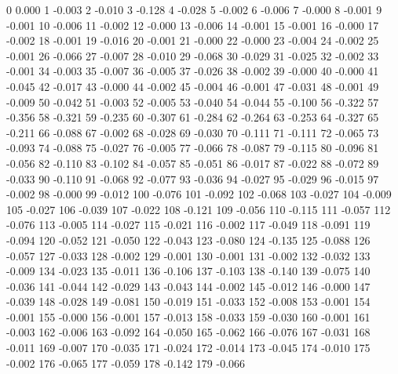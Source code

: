0 0.000
1 -0.003
2 -0.010
3 -0.128
4 -0.028
5 -0.002
6 -0.006
7 -0.000
8 -0.001
9 -0.001
10 -0.006
11 -0.002
12 -0.000
13 -0.006
14 -0.001
15 -0.001
16 -0.000
17 -0.002
18 -0.001
19 -0.016
20 -0.001
21 -0.000
22 -0.000
23 -0.004
24 -0.002
25 -0.001
26 -0.066
27 -0.007
28 -0.010
29 -0.068
30 -0.029
31 -0.025
32 -0.002
33 -0.001
34 -0.003
35 -0.007
36 -0.005
37 -0.026
38 -0.002
39 -0.000
40 -0.000
41 -0.045
42 -0.017
43 -0.000
44 -0.002
45 -0.004
46 -0.001
47 -0.031
48 -0.001
49 -0.009
50 -0.042
51 -0.003
52 -0.005
53 -0.040
54 -0.044
55 -0.100
56 -0.322
57 -0.356
58 -0.321
59 -0.235
60 -0.307
61 -0.284
62 -0.264
63 -0.253
64 -0.327
65 -0.211
66 -0.088
67 -0.002
68 -0.028
69 -0.030
70 -0.111
71 -0.111
72 -0.065
73 -0.093
74 -0.088
75 -0.027
76 -0.005
77 -0.066
78 -0.087
79 -0.115
80 -0.096
81 -0.056
82 -0.110
83 -0.102
84 -0.057
85 -0.051
86 -0.017
87 -0.022
88 -0.072
89 -0.033
90 -0.110
91 -0.068
92 -0.077
93 -0.036
94 -0.027
95 -0.029
96 -0.015
97 -0.002
98 -0.000
99 -0.012
100 -0.076
101 -0.092
102 -0.068
103 -0.027
104 -0.009
105 -0.027
106 -0.039
107 -0.022
108 -0.121
109 -0.056
110 -0.115
111 -0.057
112 -0.076
113 -0.005
114 -0.027
115 -0.021
116 -0.002
117 -0.049
118 -0.091
119 -0.094
120 -0.052
121 -0.050
122 -0.043
123 -0.080
124 -0.135
125 -0.088
126 -0.057
127 -0.033
128 -0.002
129 -0.001
130 -0.001
131 -0.002
132 -0.032
133 -0.009
134 -0.023
135 -0.011
136 -0.106
137 -0.103
138 -0.140
139 -0.075
140 -0.036
141 -0.044
142 -0.029
143 -0.043
144 -0.002
145 -0.012
146 -0.000
147 -0.039
148 -0.028
149 -0.081
150 -0.019
151 -0.033
152 -0.008
153 -0.001
154 -0.001
155 -0.000
156 -0.001
157 -0.013
158 -0.033
159 -0.030
160 -0.001
161 -0.003
162 -0.006
163 -0.092
164 -0.050
165 -0.062
166 -0.076
167 -0.031
168 -0.011
169 -0.007
170 -0.035
171 -0.024
172 -0.014
173 -0.045
174 -0.010
175 -0.002
176 -0.065
177 -0.059
178 -0.142
179 -0.066
